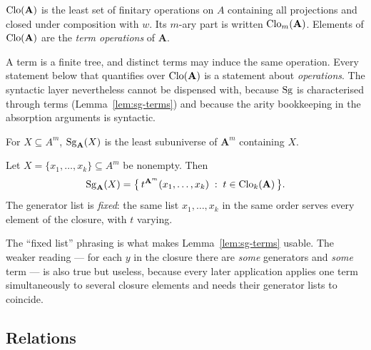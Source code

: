 \begin{definition}\label{def:clone}
$\operatorname{Clo}(\mathbf A)$ is the least set of finitary operations on $A$ containing all
projections and closed under composition with $w$. Its $m$-ary part is written
$\operatorname{Clo}_{m}(\mathbf A)$. Elements of $\operatorname{Clo}(\mathbf A)$ are the \emph{term
operations} of $\mathbf A$.
\end{definition}

\begin{hazard}\label{haz:term-vs-op}
A term is a finite tree, and distinct terms may induce the same operation.
Every statement below that quantifies over $\operatorname{Clo}(\mathbf A)$ is a statement
about \emph{operations}. The syntactic layer nevertheless cannot be dispensed
with, because $\operatorname{Sg}$ is characterised through terms (Lemma~\ref{lem:sg-terms})
and because the arity bookkeeping in the absorption arguments is syntactic.
\end{hazard}

\begin{definition}[Generation]\label{def:sg}
For $X\subseteq A^{m}$, $\operatorname{Sg}_{\mathbf A}(X)$ is the least subuniverse of
$\mathbf A^{m}$ containing $X$.
\end{definition}

\begin{lemma}\label{lem:sg-terms}
Let $X=\{x_{1},\dots,x_{k}\}\subseteq A^{m}$ be nonempty. Then
\[
  \operatorname{Sg}_{\mathbf A}(X)=\bigl\{\,t^{\mathbf A^{m}}(x_{1},\dots,x_{k})
      \;:\;t\in\operatorname{Clo}_{k}(\mathbf A)\,\bigr\}.
\]
The generator list is \emph{fixed}: the same list $x_{1},\dots,x_{k}$ in the
same order serves every element of the closure, with $t$ varying.
\end{lemma}

\begin{hazard}\label{haz:sg-fixed-list}
The ``fixed list'' phrasing is what makes Lemma~\ref{lem:sg-terms} usable. The
weaker reading --- for each $y$ in the closure there are \emph{some}
generators and \emph{some} term --- is also true but useless, because every
later application applies one term simultaneously to several closure elements
and needs their generator lists to coincide.
\end{hazard}

\subsection{Relations}

